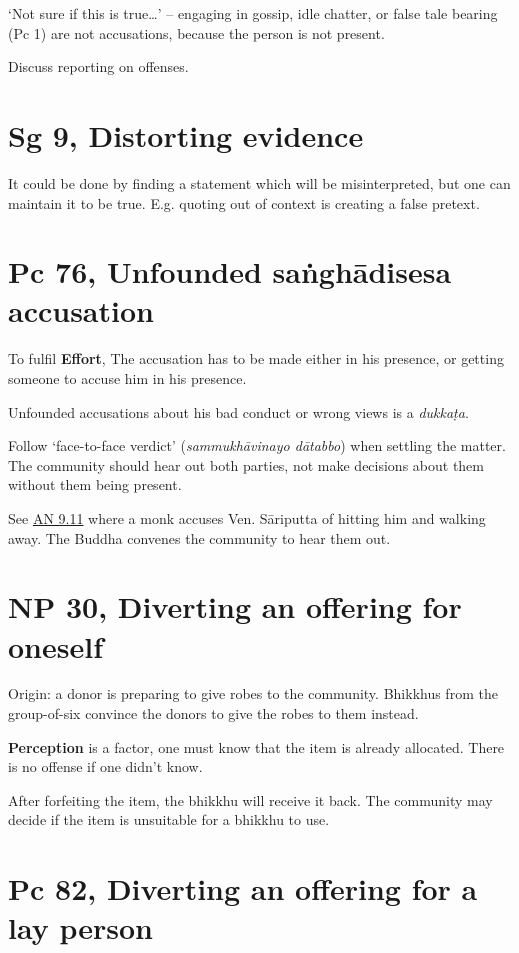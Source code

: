 `Not sure if this is true\ldots{}' -- engaging in gossip, idle chatter,
or false tale bearing (Pc 1) are not accusations, because the person is
not present.

Discuss reporting on offenses.

\clearpage

\section{Sg 9, Distorting evidence}

It could be done by finding a statement which will be misinterpreted,
but one can maintain it to be true. E.g. quoting out of context is
creating a false pretext.

\section{Pc 76, Unfounded saṅghādisesa accusation}

To fulfil \textbf{Effort}, The accusation has to be made either in his
presence, or getting someone to accuse him in his presence.

Unfounded accusations about his bad conduct or wrong views is a
\emph{dukkaṭa}.

Follow `face-to-face verdict' (\emph{sammukhāvinayo dātabbo}) when
settling the matter. The community should hear out both parties, not
make decisions about them without them being present.

See \href{https://suttacentral.net/an9.11/en/sujato}{AN 9.11} where a
monk accuses Ven. Sāriputta of hitting him and walking away. The Buddha
convenes the community to hear them out.

\section{NP 30, Diverting an offering for oneself}

Origin: a donor is preparing to give robes to the community. Bhikkhus
from the group-of-six convince the donors to give the robes to them
instead.

\textbf{Perception} is a factor, one must know that the item is already
allocated. There is no offense if one didn't know.

After forfeiting the item, the bhikkhu will receive it back. The
community may decide if the item is unsuitable for a bhikkhu to use.

\section{Pc 82, Diverting an offering for a lay person}

